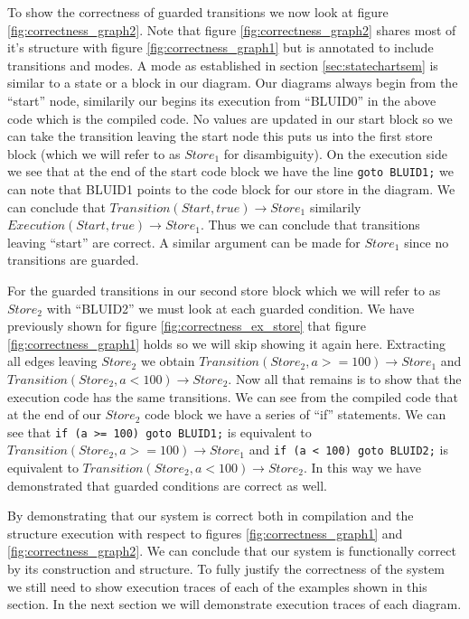 To show the correctness of guarded transitions we now look at figure \ref{fig:correctness_graph2}. Note that figure \ref{fig:correctness_graph2} shares most of it's structure with figure \ref{fig:correctness_graph1} but is annotated to include transitions and modes. A mode as established in section \ref{sec:statechartsem} is similar to a state or a block in our diagram. Our diagrams always begin from the ``start'' node, similarily our begins its execution from ``BLUID0'' in the above code which is the compiled code. No values are updated in our start block so we can take the transition leaving the start node this puts us into the first store block (which we will refer to as $Store_1$ for disambiguity). On the execution side we see that at the end of the start code block we have the line \texttt{goto BLUID1;} we can note that BLUID1 points to the code block for our store in the diagram. We can conclude that $Transition(Start, true) \rightarrow Store_1$ similarily $Execution(Start, true) \rightarrow Store_1$. Thus we can conclude that transitions leaving ``start'' are correct. A similar argument can be made for $Store_1$ since no transitions are guarded.

For the guarded transitions in our second store block which we will refer to as $Store_2$ with ``BLUID2'' we must look at each guarded condition. We have previously shown for figure \ref{fig:correctness_ex_store} that figure \ref{fig:correctness_graph1} holds so we will skip showing it again here. Extracting all edges leaving $Store_2$ we obtain $Transition(Store_2, a >= 100) \rightarrow Store_1$ and $Transition(Store_2, a < 100) \rightarrow Store_2$. Now all that remains is to show that the execution code has the same transitions. We can see from the compiled code that at the end of our $Store_2$ code block we have a series of ``if'' statements. We can see that \texttt{if (a >= 100) goto BLUID1;} is equivalent to $Transition(Store_2, a >= 100) \rightarrow Store_1$ and \texttt{if (a < 100) goto BLUID2;} is equivalent to $Transition(Store_2, a < 100) \rightarrow Store_2$. In this way we have demonstrated that guarded conditions are correct as well.

By demonstrating that our system is correct both in compilation and the structure execution with respect to figures \ref{fig:correctness_graph1} and \ref{fig:correctness_graph2}. We can conclude that our system is functionally correct by its construction and structure. To fully justify the correctness of the system we still need to show execution traces of each of the examples shown in this section. In the next section we will demonstrate execution traces of each diagram.


